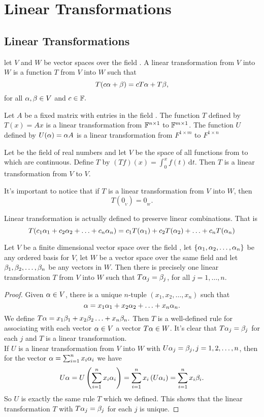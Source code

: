\documentclass{mynotes}
\begin{document}
\tableofcontents
\chapter{Linear Transformations}
\section{Linear Transformations}
\begin{definition}
let $V$ and $W$ be vector spaces over the field \F. A linear transformation from $V$ into $W$ is a function $T$ from $V$ into $W$ such that $$T(c\alpha+\beta) = cT\alpha+T\beta,$$ for all $\alpha,\beta\in V$ and $c\in\mathbb{F}.$
\end{definition}
\begin{example}
Let $A$ be a fixed \mbyn matrix with entries in the field \F. The function $T$ defined by $T(x) = Ax$ is a linear transformation from $\mathbb{F}^{n\times1}$ to $\mathbb{F}^{m\times1}$. The function $U$ defined by $U(\alpha) = \alpha A$ is a linear transformation from $F^{1\times m}$ to $F^{1\times n}$
\end{example}
\begin{example}
Let \R{} be the field of real numbers and let $V$ be the space of all functions from \R{} to \R{} which are continuous. Define $T$ by $(Tf)(x) = \int_0^x f(t)\,\mathrm{d}t$. Then $T$ is a linear transformation from $V$ to $V$.
\end{example}
\begin{remark}
It's important to notice that if $T$ is a linear transformation from $V$ into $W$, then $$T(0_{{}_V}) = 0_{{}_W}.$$
\end{remark}
\begin{remark}
Linear transformation is actually defined to preserve linear combinations. That is 
$$T(c_1\alpha_1+c_2\alpha_2+\ldots + c_n\alpha_n) = c_1T(\alpha_1)+c_2T(\alpha_2)+\ldots + c_nT(\alpha_n)$$
\end{remark}
\begin{theorem}\label{t1}
Let $V$ be a finite dimensional vector space over the field \F, let $\{\alpha_1,\alpha_2,\ldots,\alpha_n\}$ be any ordered basis for $V$, let $W$ be a vector space over the same field \F{} and let $\beta_1,\beta_2,\ldots,\beta_n$ be any vectors in $W$. Then there is precisely one linear transformation $T$ from $V$ into $W$ such that $T\alpha_j = \beta_j$, for all $j=1,\ldots, n$.
\end{theorem}
\begin{proof}
Given $\alpha\in V$, there is a unique $n$-tuple $(x_1,x_2,\ldots,x_n)$ such that $$\alpha = x_1\alpha_1+x_2\alpha_2+\ldots+x_n\alpha_n.$$We define $T\alpha = x_1\beta_1+x_2\beta_2\ldots +x_n\beta_n.$ Then $T$ is a well-defined rule for associating with each vector $\alpha\in V$ a vector $T\alpha\in W$. It's clear that $T\alpha_j = \beta_j$ for each $j$ and $T$ is a linear transformation. \\
If $U$ is a linear transformation from $V$ into $W$ with $U\alpha_j=\beta_j, j=1,2,\ldots,n$, then for the vector $\alpha = \sum_{i=1}^{n} x_i\alpha_i$ we have 
$$
U\alpha = U\left(\sum_{i=1}^nx_i\alpha_i\right)
	= \sum_{i=1}^nx_i\left(U\alpha_i\right)
	= \sum_{i=1}^n x_i\beta_i.
$$So $U$ is exactly the same rule $T$ which we defined. This shows that the linear transformation $T$ with $T\alpha_j = \beta_j$ for each $j$ is unique.
\end{proof}
\end{document}
